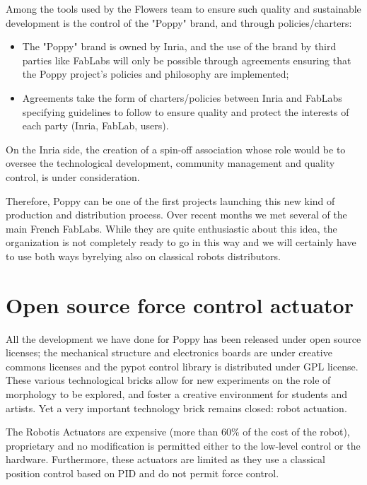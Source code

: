 Among the tools used by the Flowers team to ensure such quality and sustainable development is the control of the "Poppy" brand, and through policies/charters:

\begin{itemize}
\item The "Poppy" brand is owned by Inria, and the use of the brand by third parties like FabLabs will only be possible through agreements ensuring that the Poppy project’s policies and philosophy are implemented;
\item Agreements take the form of charters/policies between Inria and FabLabs specifying guidelines to follow to ensure quality and protect the interests of each party (Inria, FabLab, users).
\end{itemize}

On the Inria side, the creation of a spin-off association whose role would be to  oversee the technological development, community management and quality control, is under consideration.



Therefore, Poppy can be one of the first projects launching this new kind of production and distribution process. Over recent months we met several of the main French FabLabs. While they are quite enthusiastic about this idea, the organization is not completely ready to go in this way and we will certainly have to use both ways byrelying also on classical robots distributors.





\section{Open source force control actuator} %
\label{sec:open_sourcing_the_robotic_actuations}

All the development we have done for Poppy has been released under open source licenses; the mechanical structure and electronics boards are under creative commons licenses and the pypot control library is distributed under GPL license. These various technological bricks allow for new experiments on the role of morphology to be explored, and foster a creative environment for students and artists. Yet a very important technology brick remains closed: robot actuation.

The Robotis Actuators are expensive (more than 60\% of the cost of the robot), proprietary and no modification is permitted either to the low-level control or the hardware. Furthermore, these actuators are limited as they use a classical position control based on PID and do not permit force control.

